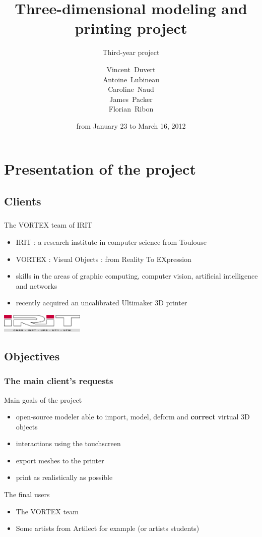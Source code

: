 \documentclass{beamer}
\title{Three-dimensional modeling and printing project}
\subtitle{Third-year project}
\author[V. Duvert, A. Lubineau, C. Naud, J. Packer, F. Ribon]{\scriptsize
Vincent~Duvert \\ Antoine~Lubineau \\ Caroline~Naud \\ James~Packer \\ Florian~Ribon}
\date{from January 23 to March 16, 2012}
\begin{document}
\frame{\titlepage}

\section{Presentation of the project}

\subsection{Clients}
\begin{frame}
	\frametitle{}
	
	\begin{block}{The \textsc{VORTEX} team of IRIT}
		\begin{itemize}
		\item \textsc{IRIT} : a research institute in computer science from Toulouse
		\item \textsc{VORTEX} : Visual Objects : from Reality To EXpression
		\item skills in the areas of graphic computing,  computer vision, artificial intelligence and networks
		\item recently acquired an uncalibrated Ultimaker 3D printer
		\end{itemize}
    \end{block}
    
    \begin{center}
		\includegraphics[width=4cm]{irit}
	\end{center}
    
\end{frame}

\subsection{Objectives}
\begin{frame}
	\frametitle{The main client's requests}
	\begin{block}{Main goals of the project} 
	\begin{itemize}
		\item open-source modeler able to import, model, deform and \textbf{correct} virtual 3D objects
		\item interactions using the touchscreen
		\item export meshes to the printer
		\item print as realistically as possible
	\end{itemize}
    \end{block}
    
    \begin{block}{The final users}
    	\begin{itemize}
		\item The VORTEX team
		\item Some artists from Artilect for example (or artists students)
		\end{itemize}
    \end{block}

\end{frame}
\end{document}

